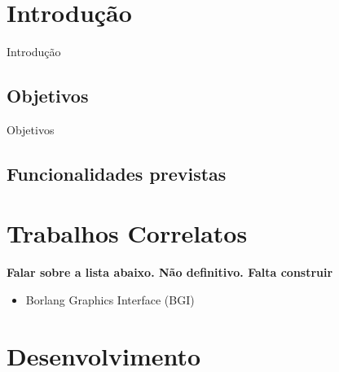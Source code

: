 \documentclass[12pt, %
openright,
oneside, %
a4paper,    %
brazil]{facom-ufu-abntex2}
\begin{document}

\tableofcontents*
\cleardoublepage





\textual



\chapter[Introdução]{Introdução}

Introdução

\section{Objetivos}
Objetivos

\section{Funcionalidades previstas}


\chapter{Trabalhos Correlatos}

\textbf{Falar sobre a lista abaixo. Não definitivo. Falta construir}
\begin{itemize}
    \item Borlang Graphics Interface (BGI)
\end{itemize}

\chapter{Desenvolvimento}
\end{document}

